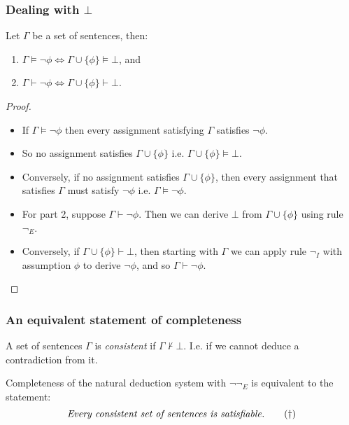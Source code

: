 \documentclass[handout]{beamer}
\begin{document}
\begin{frame}
\frametitle{Dealing with $\bot$}
\begin{lemma}\label{L:equiv}
Let $\Gamma$ be a set of sentences, then:
\begin{enumerate}
\item $\Gamma\models \neg\phi\iff \Gamma\cup\{\phi\}\models\bot$, and
\item $\Gamma\vdash \neg\phi\iff \Gamma\cup\{\phi\}\vdash\bot$.
\end{enumerate}
\end{lemma}
\begin{proof}
\begin{itemize}
\item If $\Gamma\models \neg\phi$ then every assignment satisfying $\Gamma$ satisfies $\neg\phi$. 
\item So no assignment satisfies $\Gamma\cup\{\phi\}$ i.e. $\Gamma\cup\{\phi\}\models\bot$. 
\item Conversely, if no assignment satisfies $\Gamma\cup\{\phi\}$, then every assignment that satisfies $\Gamma$ must satisfy $\neg\phi$ i.e. $\Gamma\models \neg\phi$.

\item For part 2, suppose $\Gamma\vdash \neg\phi$. Then we can derive $\bot$ from $\Gamma\cup\{\phi\}$ using rule $\neg_E$.
\item Conversely, if $\Gamma\cup\{\phi\}\vdash \bot$, then starting with $\Gamma$ we can apply rule $\neg_I$ with assumption $\phi$ to derive $\neg\phi$, and so $\Gamma\vdash \neg\phi$. 
\end{itemize}
\end{proof}
\end{frame}

\begin{frame}
\frametitle{An equivalent statement of completeness }
\begin{definition}[Consistent]
A set of sentences $\Gamma$ is \emph{consistent} if $\Gamma\not\vdash \bot$. I.e. if we cannot deduce a contradiction from it.
\end{definition} 
\vspace{1cm}
\begin{lemma}
Completeness of the natural deduction system with $\neg\neg_E$ is equivalent to the statement:
\begin{equation*}\text{\emph{Every consistent set of sentences is satisfiable}}.\tag{$\dagger$}\end{equation*}
\end{lemma}
\end{frame}
\end{document}
